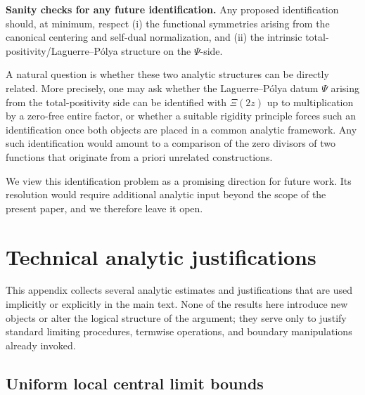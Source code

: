 \documentclass[12pt]{amsart}
\theoremstyle{definition}
\theoremstyle{remark}
\begin{document}
\smallskip
\noindent\textbf{Sanity checks for any future identification.}
Any proposed identification should, at minimum, respect (i) the functional symmetries arising from the canonical centering and self-dual normalization, and (ii) the intrinsic total-positivity/Laguerre--P\'olya structure on the $\Psi$-side\cite{Schoenberg1951,Edrei1952,karlin1968total,Levin1964}.


A natural question is whether these two analytic structures can be directly related.
More precisely, one may ask whether the Laguerre--P\'olya datum $\Psi$ arising from the
total-positivity side can be identified with $\Xi(2z)$ up to multiplication by a
zero-free entire factor, or whether a suitable rigidity principle forces such an
identification once both objects are placed in a common analytic framework. Any such
identification would amount to a comparison of the zero divisors of two functions that
originate from a priori unrelated constructions.

We view this identification problem as a promising direction for future work. Its
resolution would require additional analytic input beyond the scope of the present
paper, and we therefore leave it open.








\appendix
\section{Technical analytic justifications}
\label{app:technical}

This appendix collects several analytic estimates and justifications that are
used implicitly or explicitly in the main text. None of the results here
introduce new objects or alter the logical structure of the argument; they serve
only to justify standard limiting procedures, termwise operations, and boundary
manipulations already invoked.

\subsection{Uniform local central limit bounds}
\label{app:ULCLT}
\end{document}
